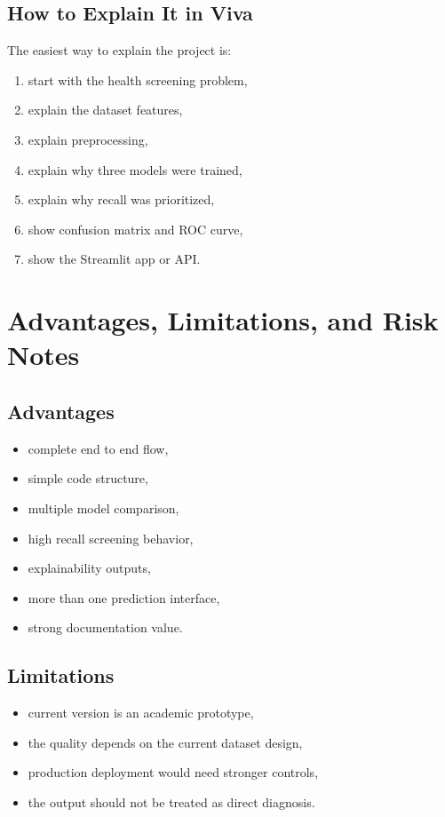 \documentclass[12pt,a4paper,openany]{report}
\begin{document}
    \section{How to Explain It in Viva}
    The easiest way to explain the project is:
    \begin{enumerate}[leftmargin=1.4cm]
    \item start with the health screening problem,
    \item explain the dataset features,
    \item explain preprocessing,
    \item explain why three models were trained,
    \item explain why recall was prioritized,
    \item show confusion matrix and ROC curve,
    \item show the Streamlit app or API.
    \end{enumerate}

    \chapter{Advantages, Limitations, and Risk Notes}
    \section{Advantages}
    \begin{itemize}[leftmargin=1.4cm]
    \item complete end to end flow,
    \item simple code structure,
    \item multiple model comparison,
    \item high recall screening behavior,
    \item explainability outputs,
    \item more than one prediction interface,
    \item strong documentation value.
    \end{itemize}

    \section{Limitations}
    \begin{itemize}[leftmargin=1.4cm]
    \item current version is an academic prototype,
    \item the quality depends on the current dataset design,
    \item production deployment would need stronger controls,
    \item the output should not be treated as direct diagnosis.
    \end{itemize}
\end{document}

